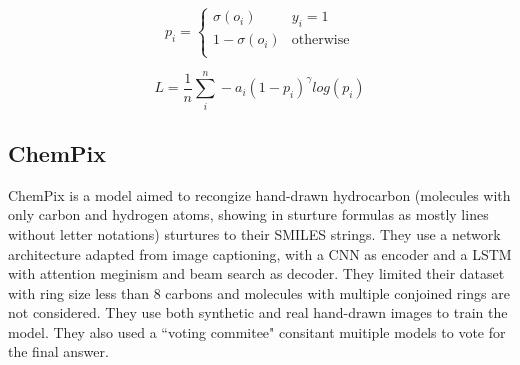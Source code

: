 \documentclass[12pt]{article}
\begin{document}
\begin{equation}
    p_i = \begin{cases} \sigma(o_i) &  y_i=1 \\
    1-\sigma(o_i) & \text{otherwise} \\
    \end{cases}
    \label{focal}
\end{equation}

\begin{equation}
    L = \frac{1}{n}\sum_i^n -a_i(1-p_i)^\gamma log(p_i)
\end{equation}




\subsection{ChemPix}
ChemPix \cite{chempix} is a model aimed to recongize hand-drawn hydrocarbon (molecules with only carbon and hydrogen atoms, showing in sturture formulas as mostly lines without letter notations) sturtures to their SMILES strings. They use a network architecture adapted from image captioning, with a CNN as encoder and a LSTM with attention meginism and beam search as decoder. \cite{chempix} They limited their dataset with ring size less than 8 carbons and molecules with multiple conjoined rings are not considered. They use both synthetic and real hand-drawn images to train the model. They also used a ``voting commitee" consitant muitiple models to vote for the final answer.
\end{document}
